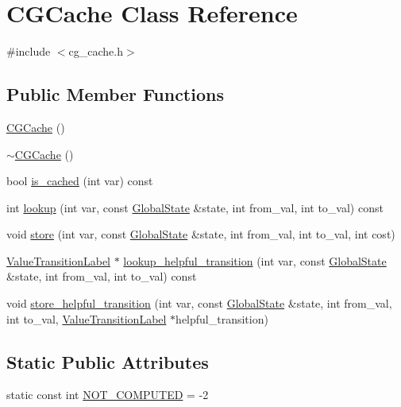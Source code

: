 \hypertarget{classCGCache}{\section{C\-G\-Cache Class Reference}
\label{classCGCache}
}


{\ttfamily \#include $<$cg\-\_\-cache.\-h$>$}

\subsection*{Public Member Functions}
\begin{DoxyCompactItemize}
\item 
\hyperlink{classCGCache_a96588e34b4c394b39462644711a55bdb}{C\-G\-Cache} ()
\item 
\hyperlink{classCGCache_a84abfac03826660e8b152f3e3b3e5dfb}{$\sim$\-C\-G\-Cache} ()
\item 
bool \hyperlink{classCGCache_a58802d9e1f1dad72bc2b15b89535f196}{is\-\_\-cached} (int var) const 
\item 
int \hyperlink{classCGCache_a54540ea4a44f5a2c29caa8883488a84d}{lookup} (int var, const \hyperlink{classGlobalState}{Global\-State} \&state, int from\-\_\-val, int to\-\_\-val) const 
\item 
void \hyperlink{classCGCache_a7677ea7457943d4081ae022ec58d5351}{store} (int var, const \hyperlink{classGlobalState}{Global\-State} \&state, int from\-\_\-val, int to\-\_\-val, int cost)
\item 
\hyperlink{structValueTransitionLabel}{Value\-Transition\-Label} $\ast$ \hyperlink{classCGCache_a5077434a3ab7427d9e0b13e01433be23}{lookup\-\_\-helpful\-\_\-transition} (int var, const \hyperlink{classGlobalState}{Global\-State} \&state, int from\-\_\-val, int to\-\_\-val) const 
\item 
void \hyperlink{classCGCache_ab9b77e6216328b13483854e6e68dc328}{store\-\_\-helpful\-\_\-transition} (int var, const \hyperlink{classGlobalState}{Global\-State} \&state, int from\-\_\-val, int to\-\_\-val, \hyperlink{structValueTransitionLabel}{Value\-Transition\-Label} $\ast$helpful\-\_\-transition)
\end{DoxyCompactItemize}
\subsection*{Static Public Attributes}
\begin{DoxyCompactItemize}
\item 
static const int \hyperlink{classCGCache_a171dd509e27a99afba696afe0c680b6d}{N\-O\-T\-\_\-\-C\-O\-M\-P\-U\-T\-E\-D} = -\/2
\end{DoxyCompactItemize}


